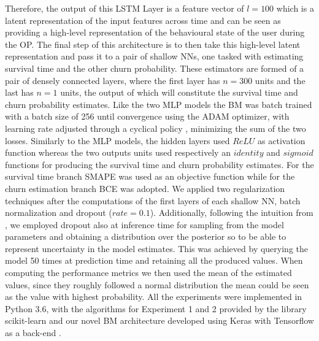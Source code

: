 Therefore, the output of this LSTM Layer is a feature vector of $l = 100$ which is a latent representation of the input features across time and can be seen as providing a high-level representation of the behavioural state of the user during the OP. The final step of this architecture is to then take this high-level latent representation and pass it to a pair of shallow NNs, one tasked with estimating survival time and the other churn probability. These estimators are formed of a pair of densely connected layers, where the first layer has $n = 300$ units and the last has $n = 1$ units, the output of which will constitute the survival time and churn probability estimates. Like the two MLP models the BM was batch trained with a batch size of 256 until convergence using the ADAM optimizer, with learning rate adjusted through a cyclical policy \cite{smith2017cyclical, chollet2015keras}, minimizing the sum of the two losses. Similarly to the MLP models, the hidden layers used $ReLU$ as activation function whereas the two outputs units used respectively an $identity$ and $sigmoid$ functions for producing the survival time and churn probability estimates. For the survival time branch SMAPE was used as an objective function while for the churn estimation branch BCE was adopted. We applied two regularization techniques after the computations of the first layers of each shallow NN, batch normalization \cite{ioffe2015batch} and dropout \cite{srivastava2014dropout} ($rate = 0.1$). Additionally, following the intuition from \cite{gal2016dropout}, we employed dropout also at inference time for sampling from the model parameters and obtaining a distribution over the posterior so to be able to represent uncertainty in the model estimates. This was achieved by querying the model 50 times at prediction time and retaining all the produced values. When computing the performance metrics we then used the mean of the estimated values, since they roughly followed a normal distribution the mean could be seen as the value with highest probability. All the experiments were implemented in Python 3.6, with the algorithms for Experiment 1 and 2 provided by the library scikit-learn \cite{scikit-learn} and our novel BM architecture developed using Keras with Tensorflow as a back-end \cite{chollet2015keras}.

